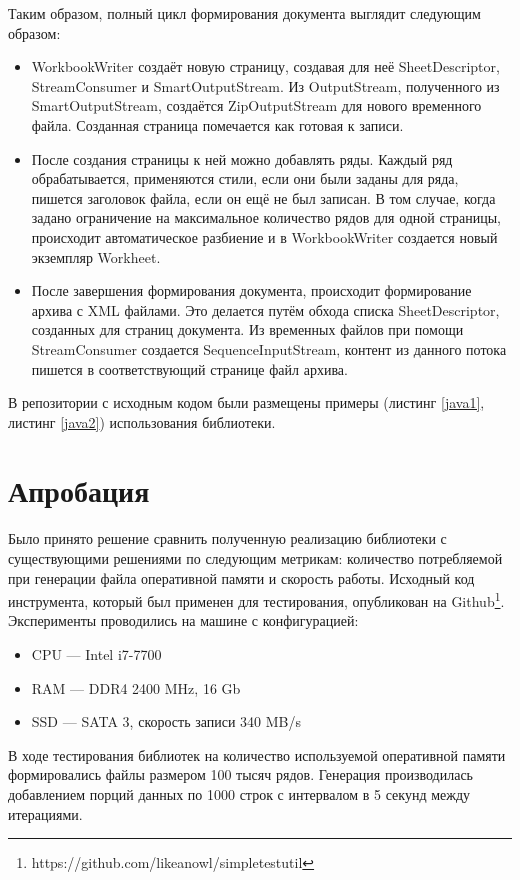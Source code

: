 \documentclass[14pt]{matmex-diploma}
\begin{document}
Таким образом, полный цикл формирования документа выглядит следующим образом: 
\begin{itemize}
    \item WorkbookWriter создаёт новую страницу, создавая для неё SheetDescriptor, StreamConsumer и SmartOutputStream. Из OutputStream, полученного из SmartOutputStream, создаётся ZipOutputStream для нового временного файла. Созданная страница помечается как готовая к записи.
    \item После создания страницы к ней можно добавлять ряды. Каждый ряд обрабатывается, применяются стили, если они были заданы для ряда, пишется заголовок файла, если он ещё не был записан. В том случае, когда задано ограничение на максимальное количество рядов для одной страницы, происходит автоматическое разбиение и в WorkbookWriter создается новый экземпляр Workheet.
    \item После завершения формирования документа, происходит формирование архива с XML файлами. Это делается путём обхода списка SheetDescriptor, созданных для страниц документа. Из временных файлов при помощи StreamConsumer создается SequenceInputStream, контент из данного потока пишется в соответствующий странице файл архива. 
\end{itemize}
В репозитории с исходным кодом были размещены примеры (листинг \ref{java1}, листинг \ref{java2}) использования библиотеки.
\section{Апробация}
Было принято решение сравнить полученную реализацию библиотеки с существующими решениями по следующим метрикам: количество потребляемой при генерации файла оперативной памяти и скорость работы. Исходный код инструмента, который был применен для тестирования, опубликован на Github\footnote{https://github.com/likeanowl/simpletestutil}.
Эксперименты проводились на машине с конфигурацией: 
\begin{itemize}
    \item CPU --- Intel i7-7700
    \item RAM --- DDR4 2400 MHz, 16 Gb
    \item SSD --- SATA 3, скорость записи 340 MB/s
\end{itemize}

В ходе тестирования библиотек на количество используемой оперативной памяти формировались файлы размером 100 тысяч рядов. Генерация производилась добавлением порций данных по 1000 строк с интервалом в 5 секунд между итерациями. 
\end{document}
